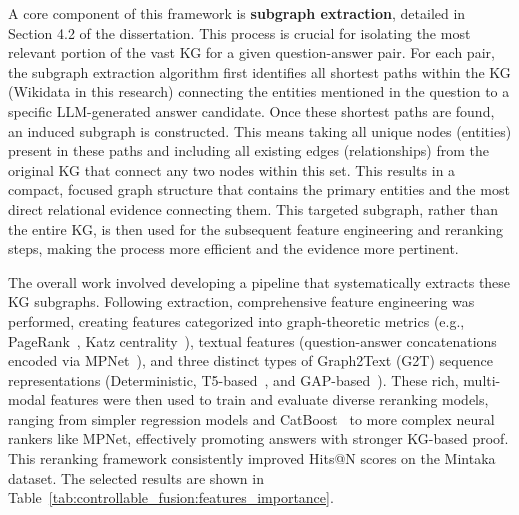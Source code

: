 A core component of this framework is \textbf{subgraph extraction}, detailed in Section 4.2 of the dissertation. This process is crucial for isolating the most relevant portion of the vast KG for a given question-answer pair. For each pair, the subgraph extraction algorithm first identifies all shortest paths within the KG (Wikidata in this research) connecting the entities mentioned in the question to a specific LLM-generated answer candidate. Once these shortest paths are found, an induced subgraph is constructed. This means taking all unique nodes (entities) present in these paths and including all existing edges (relationships) from the original KG that connect any two nodes within this set. This results in a compact, focused graph structure that contains the primary entities and the most direct relational evidence connecting them. This targeted subgraph, rather than the entire KG, is then used for the subsequent feature engineering and reranking steps, making the process more efficient and the evidence more pertinent.

The overall work involved developing a pipeline that systematically extracts these KG subgraphs. Following extraction, comprehensive feature engineering was performed, creating features categorized into graph-theoretic metrics (e.g., PageRank~\cite{page1999pagerank}, Katz centrality~\cite{katz1953new}), textual features (question-answer concatenations encoded via MPNet~\cite{DBLP:conf/nips/Song0QLL20}), and three distinct types of Graph2Text (G2T) sequence representations (Deterministic, T5-based~\cite{DBLP:journals/corr/abs-2007-08426}, and GAP-based~\cite{DBLP:conf/coling/ColasAW22-GAP}). These rich, multi-modal features were then used to train and evaluate diverse reranking models, ranging from simpler regression models and CatBoost~\cite{DBLP:conf/nips/ProkhorenkovaGV18-catboost} to more complex neural rankers like MPNet, effectively promoting answers with stronger KG-based proof. This reranking framework consistently improved Hits@N scores on the Mintaka dataset. The selected results are shown in Table~\ref{tab:controllable_fusion:features_importance}.

